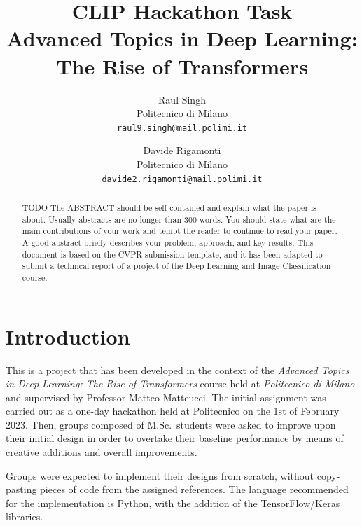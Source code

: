 \documentclass[10pt,twocolumn,letterpaper]{article}
\begin{document}
\title{CLIP Hackathon Task \\ \normalsize\bfseries Advanced Topics in Deep Learning: The Rise of Transformers}

\author{Raul Singh\\
Politecnico di Milano\\
{\tt\small raul9.singh@mail.polimi.it}
\and
Davide Rigamonti\\
Politecnico di Milano\\
{\tt\small davide2.rigamonti@mail.polimi.it}
}

\maketitle

\begin{abstract}
   TODO The ABSTRACT should be self-contained and explain what the paper is about. Usually abstracts are no longer than 300 words. You should state what are the main contributions of your work and tempt the reader to continue to read your paper. A good abstract briefly describes your problem, approach, and key results. This document is based on the CVPR submission template, and it has been adapted to submit a technical report of a project of the Deep Learning and Image Classification course.
\end{abstract}

\section{Introduction}
This is a project that has been developed in the context of the \textit{Advanced Topics in Deep Learning: The Rise of Transformers} course held at \textit{Politecnico di Milano} and supervised by Professor Matteo Matteucci.
The initial assignment was carried out as a one-day hackathon held at Politecnico on the 1st of February 2023.
Then, groups composed of M.Sc.\ students were asked to improve upon their initial design in order to overtake their baseline performance by means of creative additions and overall improvements.

Groups were expected to implement their designs from scratch, without copy-pasting pieces of code from the assigned references.
The language recommended for the implementation is \href{https://www.python.org/}{Python}, with the addition of the \href{https://www.tensorflow.org/}{TensorFlow}/\href{https://keras.io/}{Keras} libraries.
\end{document}
